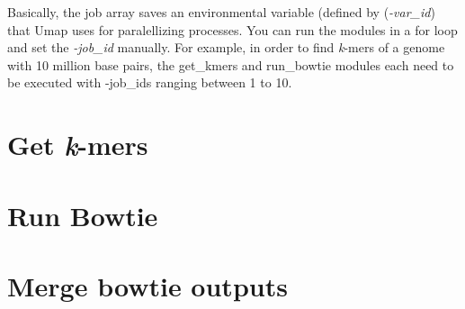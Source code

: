 \documentclass[letterpaper,10pt,english]{sphinxmanual}
\begin{document}
Basically, the job array saves an environmental variable (defined by (\emph{-var\_id}) that Umap uses for paralellizing processes.
You can run the modules in a for loop and set the \emph{-job\_id} manually.
For example, in order to find \emph{k}-mers of a genome with 10 million base pairs, the get\_kmers
and run\_bowtie modules each need to be executed with -job\_ids ranging between 1 to 10.


\chapter{Get \emph{k}-mers}
\label{documentation:get-k-mers}\label{documentation:module-umap}

\begin{fulllineitems}
\label{documentation:umap.GetKmers}
\end{fulllineitems}



\chapter{Run Bowtie}
\label{documentation:run-bowtie}

\begin{fulllineitems}
\label{documentation:umap.BowtieWrapper}
\end{fulllineitems}



\chapter{Merge bowtie outputs}
\label{documentation:merge-bowtie-outputs}

\begin{fulllineitems}
\label{documentation:umap.UnifyBowtie}
\end{fulllineitems}
\end{document}
